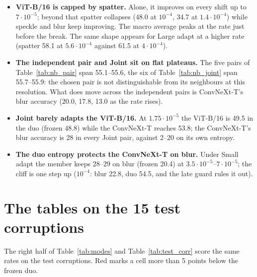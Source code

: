 \documentclass[10pt]{article}
\newcommand{\vit}{ViT-B/16}
\newcommand{\cnx}{ConvNeXt-T}
\begin{document}
\begin{table}[H]
  \centering\small
  \caption{Small adapt: the duo's accuracy on each tuning shift and the \cnx{}'s average, around the chosen rate (bold); mean over 3 seeds.}
  \label{tab:nb_small}
  
\end{table}

\begin{table}[H]
  \centering\small
  \caption{Joint: the duo's accuracy on each tuning shift, and the members' averages, around the chosen pair (bold); mean over 3 seeds.}
  \label{tab:nb_joint}
  \resizebox{\linewidth}{!}{}
\end{table}

\begin{itemize}
  \item \textbf{\vit{} is capped by spatter.} Alone, it improves on every shift up to \(7{\cdot}10^{-5}\); beyond that spatter collapses (48.0 at \(10^{-4}\), 34.7 at \(1.4{\cdot}10^{-4}\)) while speckle and blur keep improving. The macro average peaks at the rate just before the break. The same shape appears for Large adapt at a higher rate (spatter 58.1 at \(5.6{\cdot}10^{-4}\) against 61.5 at \(4{\cdot}10^{-4}\)).
  \item \textbf{The independent pair and Joint sit on flat plateaus.} The five pairs of Table~\ref{tab:nb_pair} span 55.1--55.6, the six of Table~\ref{tab:nb_joint} span 55.7--55.9: the chosen pair is not distinguishable from its neighbours at this resolution. What does move across the independent pairs is \cnx{}'s blur accuracy (20.0, 17.8, 13.0 as the rate rises).
  \item \textbf{Joint barely adapts the \vit{}.} At \(1.75{\cdot}10^{-5}\) the \vit{} is 49.5 in the duo (frozen 48.8) while the \cnx{} reaches 53.8; the \cnx{}'s blur accuracy is 28 in every Joint pair, against 2--20 on its own entropy.
  \item \textbf{The duo entropy protects the \cnx{} on blur.} Under Small adapt the member keeps 28--29 on blur (frozen 20.4) at \(3.5{\cdot}10^{-5}\)--\(7{\cdot}10^{-5}\); the cliff is one step up (\(10^{-4}\): blur 22.8, duo 54.5, and the late guard rules it out).
\end{itemize}

\section{The tables on the 15 test corruptions}\label{sec:test}
The right half of Table~\ref{tab:modes} and Table~\ref{tab:test_corr} score the same rates on the test corruptions. Red marks a cell more than 5 points below the frozen duo.
\end{document}
